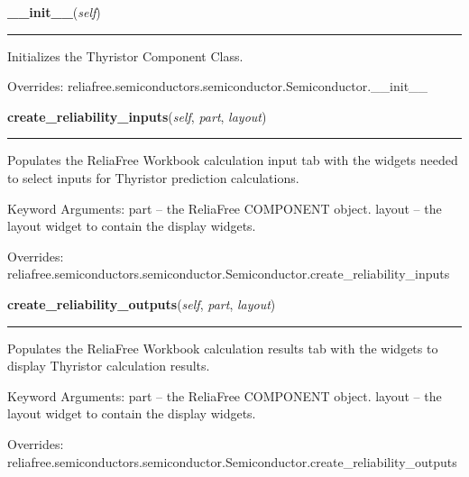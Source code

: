\hspace{.8\funcindent}\begin{boxedminipage}{\funcwidth}

    \raggedright \textbf{\_\_init\_\_}(\textit{self})

    \vspace{-1.5ex}

    \rule{\textwidth}{0.5\fboxrule}
\setlength{\parskip}{2ex}
    Initializes the Thyristor Component Class.

\setlength{\parskip}{1ex}
      Overrides: reliafree.semiconductors.semiconductor.Semiconductor.\_\_init\_\_

    \end{boxedminipage}

    \vspace{0.5ex}

\hspace{.8\funcindent}\begin{boxedminipage}{\funcwidth}

    \raggedright \textbf{create\_reliability\_inputs}(\textit{self}, \textit{part}, \textit{layout})

    \vspace{-1.5ex}

    \rule{\textwidth}{0.5\fboxrule}
\setlength{\parskip}{2ex}
    Populates the ReliaFree Workbook calculation input tab with the widgets
    needed to select inputs for Thyristor prediction calculations.

    Keyword Arguments: part   -- the ReliaFree COMPONENT object. layout -- 
    the layout widget to contain the display widgets.

\setlength{\parskip}{1ex}
      Overrides: reliafree.semiconductors.semiconductor.Semiconductor.create\_reliability\_inputs

    \end{boxedminipage}

    \vspace{0.5ex}

\hspace{.8\funcindent}\begin{boxedminipage}{\funcwidth}

    \raggedright \textbf{create\_reliability\_outputs}(\textit{self}, \textit{part}, \textit{layout})

    \vspace{-1.5ex}

    \rule{\textwidth}{0.5\fboxrule}
\setlength{\parskip}{2ex}
    Populates the ReliaFree Workbook calculation results tab with the 
    widgets to display Thyristor calculation results.

    Keyword Arguments: part   -- the ReliaFree COMPONENT object. layout -- 
    the layout widget to contain the display widgets.

\setlength{\parskip}{1ex}
      Overrides: reliafree.semiconductors.semiconductor.Semiconductor.create\_reliability\_outputs

    \end{boxedminipage}

